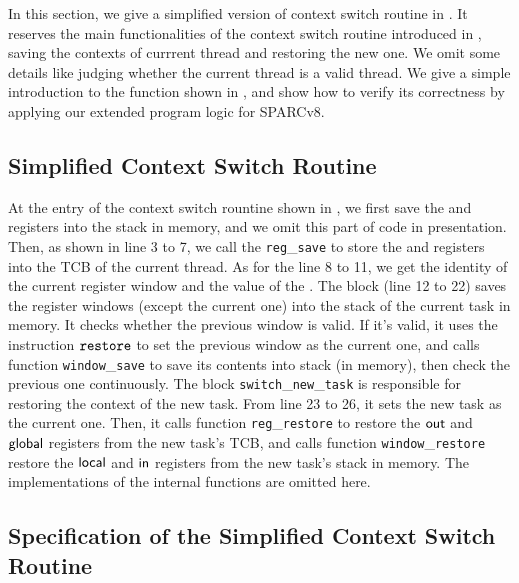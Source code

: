 In this section, we give a simplified version of context switch routine in 
\Fig{\ref{fig:Main function of context switch routine}}. It reserves the 
main functionalities of the context switch routine introduced in 
\Sec{\ref{sec:ctxswitch}}, \eg saving the contexts of currrent thread 
and restoring the new one. We omit some details like judging whether the 
current thread is a valid thread. We give a simple introduction to the 
function shown in \Fig{\ref{fig:Main function of context switch routine}}, 
and show how to verify its correctness by applying our extended program 
logic for SPARCv8. 

\subsection{Simplified Context Switch Routine}

At the entry of the context switch rountine shown in
\Fig{\ref{fig:Main function of context switch routine}}, we first 
save the \localRN{} and \inRN{} registers into the stack in memory, 
and we omit this part of code in presentation. 
Then, as shown in line 3 to 7, we call the \texttt{reg}\_\texttt{save}  
to store the \outRN{} and \globalRN{} registers into the TCB 
of the current thread. As for the line 8 to 11, we get the identity of 
the current register window and the value of the \regwim{}. 
The block \SaveUsedWin (line 12 to 22) saves the register windows 
(except the current one) into the stack of the current task in memory. 
It checks whether the previous window is valid. If it's valid, it 
uses the instruction $\texttt{restore}{}$ to set the previous window as the 
current one, and calls function \texttt{window}\_\texttt{save} to 
save its contents into stack (in memory), then check the previous 
one continuously. 
The block \texttt{switch}\_\texttt{new}\_\texttt{task} is responsible 
for restoring the context of the new task. From line 23 to 26, it 
sets the new task as the current one. Then, it calls function 
\texttt{reg}\_\texttt{restore} to restore the $\textsf{out}$ and $\textsf{global}$ 
registers from the new task's TCB, and calls 
function \texttt{window}\_\texttt{restore} restore the 
$\textsf{local}$ and $\textsf{in}$ registers from the new task's stack in memory. 
The implementations of the internal functions are omitted here. 

\subsection{Specification of the Simplified Context Switch Routine}

